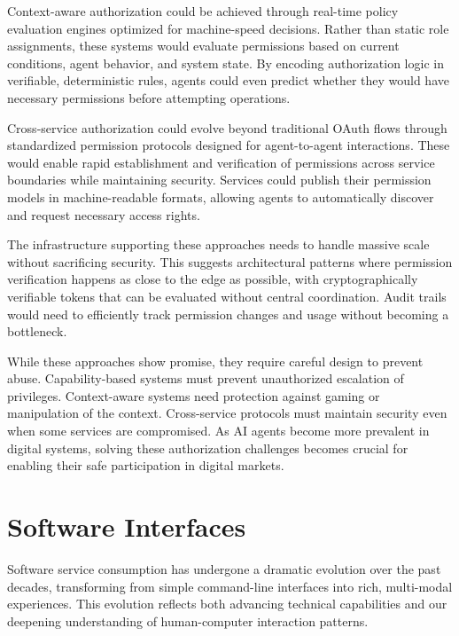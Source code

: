\documentclass{article}
\begin{document}
Context-aware authorization could be achieved through real-time policy evaluation engines optimized for machine-speed decisions. Rather than static role assignments, these systems would evaluate permissions based on current conditions, agent behavior, and system state. By encoding authorization logic in verifiable, deterministic rules, agents could even predict whether they would have necessary permissions before attempting operations.

Cross-service authorization could evolve beyond traditional OAuth flows through standardized permission protocols designed for agent-to-agent interactions. These would enable rapid establishment and verification of permissions across service boundaries while maintaining security. Services could publish their permission models in machine-readable formats, allowing agents to automatically discover and request necessary access rights.

The infrastructure supporting these approaches needs to handle massive scale without sacrificing security. This suggests architectural patterns where permission verification happens as close to the edge as possible, with cryptographically verifiable tokens that can be evaluated without central coordination. Audit trails would need to efficiently track permission changes and usage without becoming a bottleneck.

While these approaches show promise, they require careful design to prevent abuse. Capability-based systems must prevent unauthorized escalation of privileges. Context-aware systems need protection against gaming or manipulation of the context. Cross-service protocols must maintain security even when some services are compromised. As AI agents become more prevalent in digital systems, solving these authorization challenges becomes crucial for enabling their safe participation in digital markets.


\section{Software Interfaces}
\label{sec:software_interface}



Software service consumption has undergone a dramatic evolution over the past decades, transforming from simple command-line interfaces into rich, multi-modal experiences. This evolution reflects both advancing technical capabilities and our deepening understanding of human-computer interaction patterns.
\end{document}
